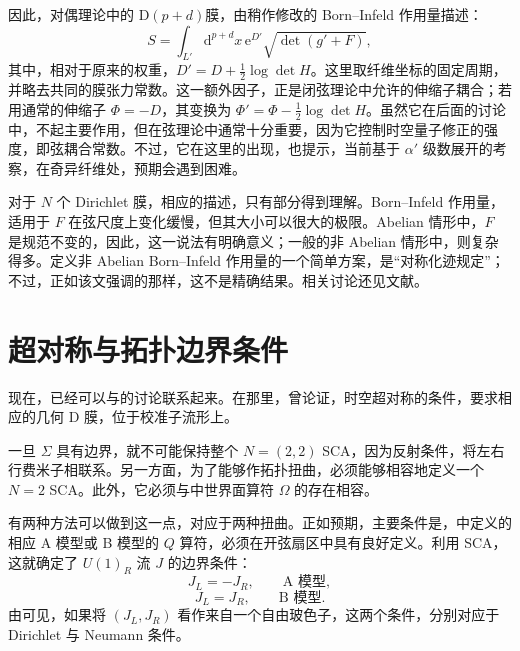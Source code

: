 因此，对偶理论中的 D$(p+d)$膜，由稍作修改的 Born--Infeld 作用量描述：
\begin{equation}\label{eq:3.164}
S=\int_{L'}\mathrm{d}^{p+d}x\,
\mathrm{e}^{D'}\sqrt{\det(g'+F)},
\end{equation}
其中，相对于原来的权重，$D'=D+\tfrac12\log\det H$。这里取纤维坐标的固定周期，并略去共同的膜张力常数。这一额外因子，正是闭弦理论中允许的伸缩子耦合；若用通常的伸缩子 $\Phi=-D$，其变换为 $\Phi'=\Phi-\tfrac12\log\det H$。虽然它在后面的讨论中，不起主要作用，但在弦理论中通常十分重要，因为它控制时空量子修正的强度，即弦耦合常数。不过，它在这里的出现，也提示，当前基于 $\alpha'$ 级数展开的考察，在奇异纤维处，预期会遇到困难。

对于 $N$ 个 Dirichlet 膜，相应的描述，只有部分得到理解。Born--Infeld 作用量，适用于 $F$ 在弦尺度上变化缓慢，但其大小可以很大的极限。Abelian 情形中，$F$ 是规范不变的，因此，这一说法有明确意义；一般的非 Abelian 情形中，则复杂得多。定义非 Abelian Born--Infeld 作用量的一个简单方案，是“对称化迹规定”；不过，正如该文强调的那样，这不是精确结果。相关讨论还见文献。

\section{超对称与拓扑边界条件}\label{sec:3.6}

现在，已经可以与的讨论联系起来。在那里，曾论证，时空超对称的条件，要求相应的几何 D 膜，位于校准子流形上。

一旦 $\Sigma$ 具有边界，就不可能保持整个 $N=(2,2)$ SCA，因为反射条件，将左右行费米子相联系。另一方面，为了能够作拓扑扭曲，必须能够相容地定义一个 $N=2$ SCA。此外，它必须与中世界面算符 $\Omega$ 的存在相容。

有两种方法可以做到这一点，对应于两种扭曲。正如预期，主要条件是，中定义的相应 A 模型或 B 模型的 $Q$ 算符，必须在开弦扇区中具有良好定义。利用 SCA，这就确定了 $U(1)_R$ 流 $J$ 的边界条件：
\begin{equation}\label{eq:3.165}
J_L=-J_R,\qquad\text{A 模型},
\end{equation}
\begin{equation}\label{eq:3.166}
J_L=J_R,\qquad\text{B 模型}.
\end{equation}
由可见，如果将 $(J_L,J_R)$ 看作来自一个自由玻色子，这两个条件，分别对应于 Dirichlet 与 Neumann 条件。

